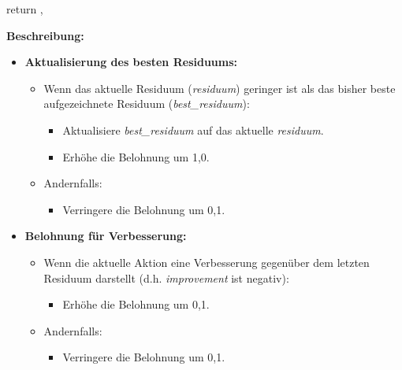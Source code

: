 \documentclass{article}
\def\code#1{\texttt{#1}}
\theoremstyle{newline}
\begin{document}
\begin{onehalfspace}
\begin{algorithm}
{{		}
	}
	
	return \text{\code{reward}}, \text{\code{done}}
	
\end{algorithm}
\medskip

\textbf{Beschreibung:}
\begin{itemize}
	\item \textbf{Aktualisierung des besten Residuums:}
	\begin{itemize}
		\item Wenn das aktuelle Residuum (\textit{residuum}) geringer ist als das bisher beste aufgezeichnete Residuum (\textit{best\_residuum}):
		\begin{itemize}
			\item Aktualisiere \textit{best\_residuum} auf das aktuelle \textit{residuum}.
			\item Erhöhe die Belohnung um 1,0.
		\end{itemize}
		\item Andernfalls:
		\begin{itemize}
			\item Verringere die Belohnung um 0,1.
		\end{itemize}
	\end{itemize}
	
	\item \textbf{Belohnung für Verbesserung:}
	\begin{itemize}
		\item Wenn die aktuelle Aktion eine Verbesserung gegenüber dem letzten Residuum darstellt (d.h. \textit{improvement} ist negativ):
		\begin{itemize}
			\item Erhöhe die Belohnung um 0,1.
		\end{itemize}
		\item Andernfalls:
		\begin{itemize}
			\item Verringere die Belohnung um 0,1.
		\end{itemize}
	\end{itemize}
	

\end{itemize}
\end{onehalfspace}
\end{document}
